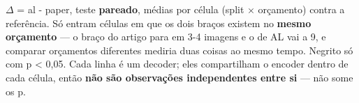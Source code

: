 \footnotesize $\Delta$ = al - paper, teste \textbf{pareado}, médias por célula (split $\times$ orçamento) contra a referência. Só entram células em que os dois braços existem no \textbf{mesmo orçamento} --- o braço do artigo para em 3-4 imagens e o de AL vai a 9, e comparar orçamentos diferentes mediria duas coisas ao mesmo tempo. Negrito só com p < 0,05. Cada linha é um decoder; eles compartilham o encoder dentro de cada célula, então \textbf{não são observações independentes entre si} --- não some os p.
\normalsize
